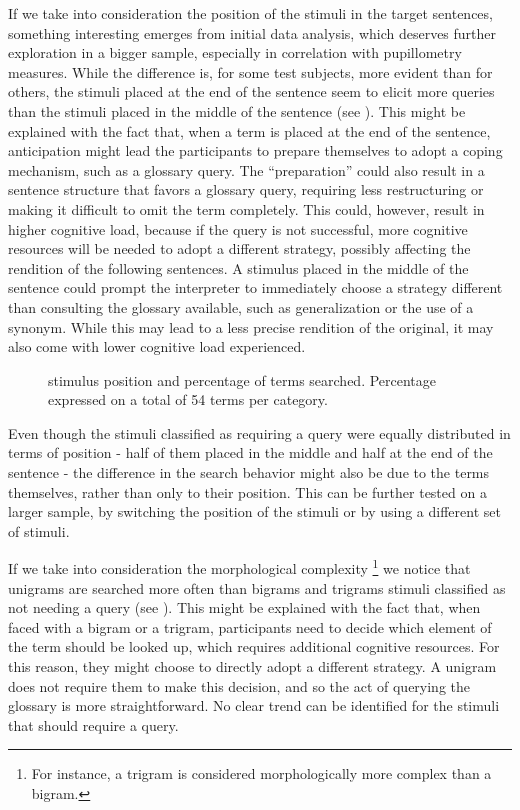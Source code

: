 \documentclass[output=paper]{langsci/langscibook}
\begin{document}
If we take into consideration the position of the stimuli in the target sentences, something interesting emerges from initial data analysis, which deserves further exploration in a bigger sample, especially in correlation with pupillometry measures. While the difference is, for some test subjects, more evident than for others, the stimuli placed at the end of the sentence seem to elicit more queries than the stimuli placed in the middle of the sentence (see ). This might be explained with the fact that, when a term is placed at the end of the sentence, anticipation might lead the participants to prepare themselves to adopt a coping mechanism, such as a glossary query. The ``preparation'' could also result in a sentence structure that favors a glossary query, requiring less restructuring or making it difficult to omit the term completely. This could, however, result in higher cognitive load, because if the query is not successful, more cognitive resources will be needed to adopt a different strategy, possibly affecting the rendition of the following sentences. A stimulus placed in the middle of the sentence could prompt the interpreter to immediately choose a strategy different than consulting the glossary available, such as generalization or the use of a synonym. While this may lead to a less precise rendition of the original, it may also come with lower cognitive load experienced.

\begin{figure}
\caption{stimulus position and percentage of terms searched. Percentage expressed on a total of 54 terms per category.}
\label{fig:prandi:10}
\end{figure}

Even though the stimuli classified as requiring a query were equally distributed in terms of position - half of them placed in the middle and half at the end of the sentence - the difference in the search behavior might also be due to the terms themselves, rather than only to their position. This can be further tested on a larger sample, by switching the position of the stimuli or by using a different set of stimuli.

If we take into consideration the morphological complexity\textstyleannotationreference{ -} \footnote{For instance, a trigram is considered morphologically more complex than a bigram.}\textstyleannotationreference{ -} we notice that unigrams are searched more often than bigrams and trigrams  stimuli classified as not needing a query (see ). This might be explained with the fact that, when faced with a bigram or a trigram, participants need to decide which element of the term should be looked up, which requires additional cognitive resources. For this reason, they might choose to directly adopt a different strategy. A unigram does not require them to make this decision, and so the act of querying the glossary is more straightforward. No clear trend can be identified for the stimuli that should require a query.
\end{document}
